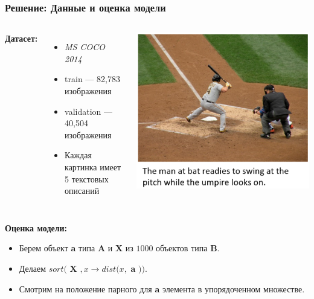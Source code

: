 \documentclass{beamer}
\begin{document}
\begin{frame}
	\frametitle{Решение: Данные и оценка модели}
	\begin{columns}[c]
		\textbf{Датасет:}
		\begin{itemize}
			\item
			\textit{MS COCO 2014}
			
			\item
			train --- 82,783 изображения
			
			\item
			validation --- 40,504 изображения
			
			\item
			Каждая картинка имеет 5 текстовых описаний
		\end{itemize}
		
		\centerline{\includegraphics[scale=0.2]{images/mscoco_sample.png}}
	\end{columns}

	\textbf{Оценка модели:}
	\begin{itemize}
		\item
		Берем объект \textbf{a} типа \textbf{A} и \textbf{X} из $1000$ объектов типа \textbf{B}.
		
		\item
		Делаем $sort($ \textbf{X} $, x \rightarrow dist(x, $ \textbf{a} $))$.
		
		\item
		Смотрим на положение парного для \textbf{a} элемента в упорядоченном множестве.
	\end{itemize}
\end{frame}
\end{document}
